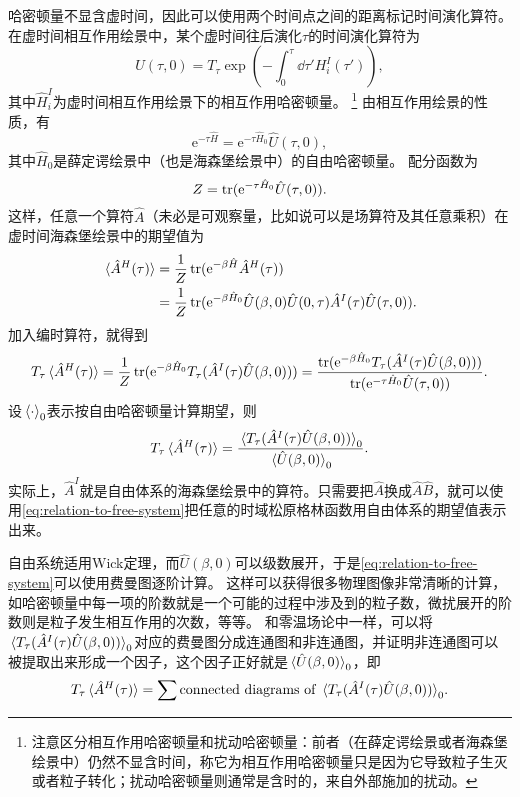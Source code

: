 \documentclass[hyperref, UTF8, a4paper]{ctexart}
\newcommand*{\ee}{\mathrm{e}}
\begin{document}
哈密顿量不显含虚时间，因此可以使用两个时间点之间的距离标记时间演化算符。在虚时间相互作用绘景中，某个虚时间往后演化$\tau$的时间演化算符为
\begin{equation}
    \hat{U}(\tau, 0) = T_\tau \exp \left( - \int_0^\tau \dd{\tau'} H_i^I(\tau') \right),
\end{equation}
其中$\hat{H}_i^I$为虚时间相互作用绘景下的相互作用哈密顿量。%
\footnote{注意区分相互作用哈密顿量和扰动哈密顿量：前者（在薛定谔绘景或者海森堡绘景中）仍然不显含时间，称它为相互作用哈密顿量只是因为它导致粒子生灭或者粒子转化；扰动哈密顿量则通常是含时的，来自外部施加的扰动。}%
由相互作用绘景的性质，有
\[
    \ee^{-\tau \hat{H}} = \ee^{- \tau \hat{H}_0} \hat{U}(\tau, 0),
\]
其中$\hat{H}_0$是薛定谔绘景中（也是海森堡绘景中）的自由哈密顿量。
配分函数为
\[
    Z = \trace (\ee^{- \tau \hat{H}_0} \hat{U}(\tau, 0)).
\]
这样，任意一个算符$\hat{A}$（未必是可观察量，比如说可以是场算符及其任意乘积）在虚时间海森堡绘景中的期望值为
\[
    \begin{aligned}
        \expval*{\hat{A}^H (\tau)} &= \frac{1}{Z} \trace (\ee^{-\beta \hat{H}} \hat{A}^H (\tau)) \\
        &= \frac{1}{Z} \trace ( \ee^{-\beta \hat{H}_0} \hat{U}(\beta, 0) \hat{U}(0, \tau) \hat{A}^I(\tau) \hat{U}(\tau, 0) ).
    \end{aligned}
\]
加入编时算符，就得到
\[
    T_\tau \expval*{\hat{A}^H (\tau)} = \frac{1}{Z} \trace (\ee^{- \beta \hat{H}_0} T_\tau (\hat{A}^I(\tau) \hat{U}(\beta, 0))) = \frac{\trace (\ee^{- \beta \hat{H}_0} T_\tau (\hat{A}^I(\tau) \hat{U}(\beta, 0)))}{\trace (\ee^{- \tau \hat{H}_0} \hat{U}(\tau, 0))}.
\]
设$\expval*{\cdot}_0$表示按自由哈密顿量计算期望，则
\begin{equation}
    T_\tau \expval*{\hat{A}^H (\tau)} = \frac{\expval*{T_\tau (\hat{A}^I (\tau) \hat{U}(\beta, 0))}_0}{\expval*{\hat{U}(\beta, 0)}_0}.
    \label{eq:relation-to-free-system}
\end{equation}
实际上，$\hat{A}^I$就是自由体系的海森堡绘景中的算符。只需要把$\hat{A}$换成$\hat{A}\hat{B}$，就可以使用\eqref{eq:relation-to-free-system}把任意的时域松原格林函数用自由体系的期望值表示出来。

自由系统适用Wick定理，而$\hat{U}(\beta, 0)$可以级数展开，于是\eqref{eq:relation-to-free-system}可以使用费曼图逐阶计算。
这样可以获得很多物理图像非常清晰的计算，如哈密顿量中每一项的阶数就是一个可能的过程中涉及到的粒子数，微扰展开的阶数则是粒子发生相互作用的次数，等等。
和零温场论中一样，可以将$\expval*{T_\tau (\hat{A}^I (\tau) \hat{U}(\beta, 0))}_0$对应的费曼图分成连通图和非连通图，并证明非连通图可以被提取出来形成一个因子，这个因子正好就是$\expval*{\hat{U}(\beta, 0)}_0$，即
\begin{equation}
    T_\tau \expval*{\hat{A}^H (\tau)} = \sum \text{connected diagrams of $\expval*{T_\tau (\hat{A}^I (\tau) \hat{U}(\beta, 0))}_0$}.
\end{equation}
\end{document}
